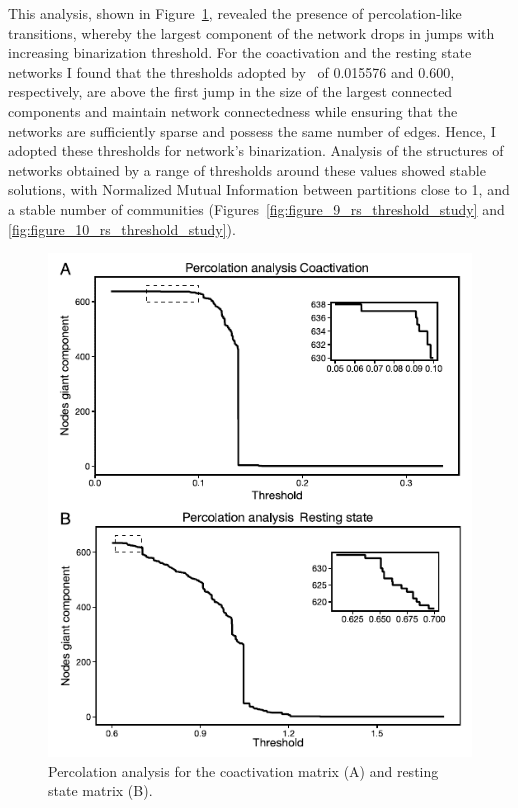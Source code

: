 This analysis, shown in Figure~\ref{fig:figure_8_percolation_analysis}, revealed the presence of percolation-like transitions, whereby the largest component of the network drops in jumps with increasing binarization threshold. For the coactivation and the resting state networks I found that the thresholds adopted by~\cite{crossley2013a} of 0.015576 and 0.600, respectively, are above the first jump in the size of the largest connected components and maintain network connectedness while ensuring that the networks are sufficiently sparse and possess the same number of edges. Hence, I adopted these thresholds for network's binarization. Analysis of the structures of networks obtained by a range of thresholds around these values showed stable solutions, with Normalized Mutual Information between partitions close to 1, and a stable number of communities (Figures~\ref{fig:figure_9_rs_threshold_study} and \ref{fig:figure_10_rs_threshold_study}).

\begin{figure}[htb!]
\centering
\includegraphics[width=0.7\linewidth]{images/figure_8_percolation_analysis_compressed.pdf}
\caption{Percolation analysis for the coactivation matrix (A) and resting state matrix (B).}
\label{fig:figure_8_percolation_analysis}
\end{figure}

